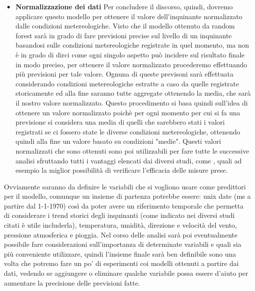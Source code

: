 \documentclass{article}
\begin{document}
\begin{itemize}
\item \textbf{Normalizzazione dei dati}
Per concludere il discorso, quindi, dovremo applicare questo modello per ottenere il valore dell'inquinante normalizzato dalle condizioni metereologiche. Visto che il modello ottenuto da random forest sarà in grado di fare previsioni precise sul livello di un inquinante basandosi sulle condizioni metereologiche registrate in quel momento, ma non è in grado di dirci come ogni singolo aspetto può incidere sul risultato finale in modo preciso, per ottenere il valore normalizzato procederemo effettuando più previsioni per tale valore. Ognuna di queste previsoni sarà effettuata considerando condizioni metereologiche estratte a caso da quelle registrate storicamente ed alla fine saranno tutte aggregate ottenendo la media, che sarà il nostro valore normalizzato. Questo procedimento si basa quindi sull'idea di ottenere un valore normalizzato poichè per ogni momento per cui si fa una previsione si considera una media di quelli che sarebbero stati i valori registrati se ci fossero state le diverse condizioni metereologiche, ottenendo quindi alla fine un valore basato su condizioni "medie". 
Questi valori normalizzati che sono ottenuti sono poi utilizzabili per fare tutte le successive analisi sfruttando tutti i vantaggi elencati dai diversi studi, come \cite{hoogerbrugge2010trends}, quali ad esempio la miglior possibilità di verificare l'efficacia delle misure prese.
\end{itemize}

Ovviamente saranno da definire le variabili che si vogliono usare come predittori per il modello, comunque un insieme di partenza potrebbe essere: unix date (ms a partire dal 1-1-1970) così da poter avere un riferimento temporale che permetta di considerare i trend storici degli inquinanti (come indicato nei diversi studi citati è utile includerla), temperatura, umidità, direzione e velocità del vento, pressione atmosferica e pioggia.
Nel corso delle analisi sarà poi eventualmente possibile fare considerazioni sull'importanza di determinate variabili e quali sia più conveniente utilizzare, quindi l'insieme finale sarà ben definibile sono una volta che potremo fare un po' di esperimenti coi modelli ottenuti a partire dai dati, vedendo se aggiungere o eliminare qualche variabile possa essere d'aiuto per aumentare la precisione delle previsioni fatte.
\end{document}
